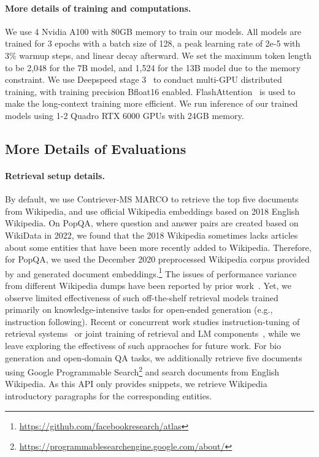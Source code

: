 \paragraph{More details of training and computations.}
We use 4 Nvidia A100 with 80GB memory to train our models. All models are trained for 3 epochs with a batch size of 128, a peak learning rate of 2e-5 with 3\% warmup steps, and linear decay afterward. We set the maximum token length to be 2,048 for the 7B model, and 1,524 for the 13B model due to the memory constraint. We use Deepspeed stage 3~\citep{rajbhandari2020zero} to conduct multi-GPU distributed training, with training precision Bfloat16 enabled. FlashAttention~\citep{dao2022flashattention} is used to make the long-context training more efficient.
We run inference of our trained models using 1-2 Quadro RTX 6000 GPUs with 24GB memory. 

\subsection{More Details of Evaluations}
\label{sec:details_experiments}
\paragraph{Retrieval setup details.}
By default, we use Contriever-MS MARCO to retrieve the top five documents from Wikipedia{, and use official Wikipedia embeddings based on 2018 English Wikipedia. On PopQA, where question and answer pairs are created based on WikiData in 2022, we found that the 2018 Wikipedia sometimes lacks articles about some entities that have been more recently added to Wikipedia. 
Therefore, for PopQA, we used the December 2020 preprocessed Wikipedia corpus provided by 
\cite{izacard2022few} and generated document embeddings.\footnote{\url{https://github.com/facebookresearch/atlas}}}
The issues of performance variance from different Wikipedia dumps have been reported by prior work~\citep{asai2019learning,izacard2022few}. 
Yet, we observe limited effectiveness of such off-the-shelf retrieval models trained primarily on knowledge-intensive tasks for open-ended generation (e.g., instruction following). 
{Recent or concurrent work studies instruction-tuning of retrieval systems~\citep{asai-etal-2023-task} or joint training of retrieval and LM components~\citep{lin2023radit}, while we leave exploring the effectivess of such appraoches for future work. }
For bio generation and open-domain QA tasks, we additionally retrieve five documents using Google Programmable Search\footnote{\url{https://programmablesearchengine.google.com/about/}} and search documents from English Wikipedia. As this API only provides snippets, we retrieve Wikipedia introductory paragraphs for the corresponding entities. 

